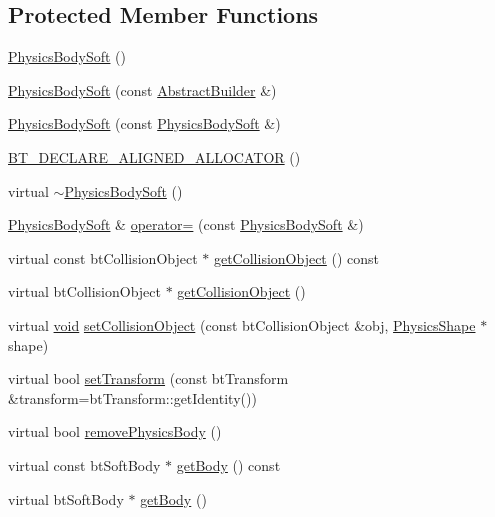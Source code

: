 \subsection*{Protected Member Functions}
\begin{DoxyCompactItemize}
\item 
\mbox{\hyperlink{classnjli_1_1_physics_body_soft_ad1a57cd27522290455d696bcf9a797d0}{Physics\+Body\+Soft}} ()
\item 
\mbox{\hyperlink{classnjli_1_1_physics_body_soft_a00848efd4496fe05e9dc05340eef2fc2}{Physics\+Body\+Soft}} (const \mbox{\hyperlink{classnjli_1_1_abstract_builder}{Abstract\+Builder}} \&)
\item 
\mbox{\hyperlink{classnjli_1_1_physics_body_soft_a6545d7e6a7706d93266e6fe5299978d4}{Physics\+Body\+Soft}} (const \mbox{\hyperlink{classnjli_1_1_physics_body_soft}{Physics\+Body\+Soft}} \&)
\item 
\mbox{\hyperlink{classnjli_1_1_physics_body_soft_a0d39f39abc7a807e9ef68e2a44a8d1af}{B\+T\+\_\+\+D\+E\+C\+L\+A\+R\+E\+\_\+\+A\+L\+I\+G\+N\+E\+D\+\_\+\+A\+L\+L\+O\+C\+A\+T\+OR}} ()
\item 
virtual \mbox{\hyperlink{classnjli_1_1_physics_body_soft_ac2c07fb5d114918183ce86208f5ca9da}{$\sim$\+Physics\+Body\+Soft}} ()
\item 
\mbox{\hyperlink{classnjli_1_1_physics_body_soft}{Physics\+Body\+Soft}} \& \mbox{\hyperlink{classnjli_1_1_physics_body_soft_af1ab4b5f7f7e8ebea26e5b8302cad734}{operator=}} (const \mbox{\hyperlink{classnjli_1_1_physics_body_soft}{Physics\+Body\+Soft}} \&)
\item 
virtual const bt\+Collision\+Object $\ast$ \mbox{\hyperlink{classnjli_1_1_physics_body_soft_a41f7c080d5c79ed719cfcfb0de35a449}{get\+Collision\+Object}} () const
\item 
virtual bt\+Collision\+Object $\ast$ \mbox{\hyperlink{classnjli_1_1_physics_body_soft_a30c0af5e858983da4b549e883e6ca21a}{get\+Collision\+Object}} ()
\item 
virtual \mbox{\hyperlink{_thread_8h_af1e856da2e658414cb2456cb6f7ebc66}{void}} \mbox{\hyperlink{classnjli_1_1_physics_body_soft_ac84a68c18afab8bf7cabdf51461d52fb}{set\+Collision\+Object}} (const bt\+Collision\+Object \&obj, \mbox{\hyperlink{classnjli_1_1_physics_shape}{Physics\+Shape}} $\ast$shape)
\item 
virtual bool \mbox{\hyperlink{classnjli_1_1_physics_body_soft_ae0db3e9ff0ab9525f3f1b8e694ce25e5}{set\+Transform}} (const bt\+Transform \&transform=bt\+Transform\+::get\+Identity())
\item 
virtual bool \mbox{\hyperlink{classnjli_1_1_physics_body_soft_adce1993fe1287488cc5cb42b30a09bcc}{remove\+Physics\+Body}} ()
\item 
virtual const bt\+Soft\+Body $\ast$ \mbox{\hyperlink{classnjli_1_1_physics_body_soft_a44c640897800dc6829b7a39284196596}{get\+Body}} () const
\item 
virtual bt\+Soft\+Body $\ast$ \mbox{\hyperlink{classnjli_1_1_physics_body_soft_afda8afc3d3ca4bcd805b134911f480a3}{get\+Body}} ()
\end{DoxyCompactItemize}
